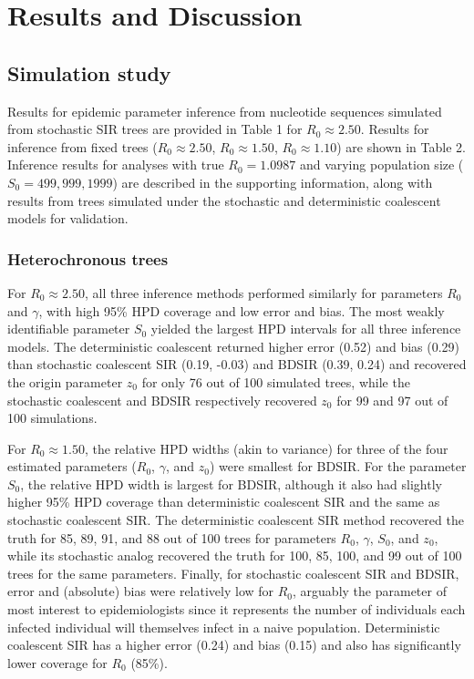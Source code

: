 \documentclass[12pt,titlepage]{article}
\newcommand{\stochCoalSIR}{stochastic coalescent SIR}
\newcommand{\deterCoalSIR}{deterministic coalescent SIR}
\newcommand{\BDSIR}{BDSIR}
\begin{document}
\section*{Results and Discussion}

\subsection{Simulation study}

Results for epidemic parameter inference from nucleotide sequences simulated from stochastic SIR trees are provided in Table 1 for $R_{0}\approx2.50$. 
Results for inference from fixed trees ($R_{0}\approx2.50$, $R_{0}\approx1.50$, $R_{0}\approx1.10$) are shown in Table 2.
Inference results for analyses with true $R_{0}=1.0987$ and varying population size ($S_{0}=499, 999, 1999$) are described in the supporting information, along with results from trees simulated under the stochastic and deterministic coalescent models for validation.     


\subsubsection{Heterochronous trees} 
For $R_0\approx2.50$, all three inference methods performed similarly for parameters $R_0$ and $\gamma$, with high 95\% HPD coverage and low error and bias.  
The most weakly identifiable parameter $S_0$ yielded the largest HPD intervals for all three inference models.  The deterministic coalescent returned higher error (0.52) and bias (0.29) than \stochCoalSIR{} (0.19, -0.03) and \BDSIR{} (0.39, 0.24) 
and recovered the origin parameter $z_0$ for only 76 out of 100 simulated trees, while the stochastic coalescent and \BDSIR{} respectively recovered $z_0$ for 99 and 97 out of 100 simulations.    

For $R_{0}\approx1.50$, the relative HPD widths (akin to variance) for three of the four estimated parameters ($R_0$, $\gamma$, and $z_0$) were smallest for \BDSIR{}.  For the 
parameter $S_0$, the relative HPD width is largest for \BDSIR{}, although it also had slightly higher 95\% HPD coverage than \deterCoalSIR{} and the same as \stochCoalSIR{}.  
The \deterCoalSIR{} method recovered the truth for 85, 89, 91, and 88 out of 100 trees for parameters $R_0$, $\gamma$, $S_0$, and $z_0$, while its stochastic analog recovered the truth for 100, 85, 100, and 99 out of 100 trees for the same parameters.
Finally, for \stochCoalSIR{} and \BDSIR{}, error and (absolute) bias were relatively low for $R_{0}$, arguably the parameter of most interest to epidemiologists since it represents the number of individuals each infected individual will themselves infect in a naive population.  
Deterministic coalescent SIR has a higher error (0.24) and bias (0.15) and also has significantly lower coverage for $R_0$ (85\%).   
\end{document}
